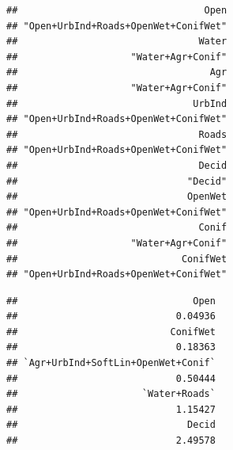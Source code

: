 \documentclass[12pt,]{book}
\newenvironment{Shaded}{\begin{snugshade}}{\end{snugshade}}
\newcommand{\CommentTok}[1]{\textcolor[rgb]{0.56,0.35,0.01}{\textit{#1}}}
\newcommand{\DataTypeTok}[1]{\textcolor[rgb]{0.13,0.29,0.53}{#1}}
\newcommand{\KeywordTok}[1]{\textcolor[rgb]{0.13,0.29,0.53}{\textbf{#1}}}
\newcommand{\NormalTok}[1]{#1}
\newcommand{\OperatorTok}[1]{\textcolor[rgb]{0.81,0.36,0.00}{\textbf{#1}}}
\newcommand{\StringTok}[1]{\textcolor[rgb]{0.31,0.60,0.02}{#1}}
\begin{document}
\begin{verbatim}
##                                 Open 
## "Open+UrbInd+Roads+OpenWet+ConifWet" 
##                                Water 
##                    "Water+Agr+Conif" 
##                                  Agr 
##                    "Water+Agr+Conif" 
##                               UrbInd 
## "Open+UrbInd+Roads+OpenWet+ConifWet" 
##                                Roads 
## "Open+UrbInd+Roads+OpenWet+ConifWet" 
##                                Decid 
##                              "Decid" 
##                              OpenWet 
## "Open+UrbInd+Roads+OpenWet+ConifWet" 
##                                Conif 
##                    "Water+Agr+Conif" 
##                             ConifWet 
## "Open+UrbInd+Roads+OpenWet+ConifWet"
\end{verbatim}

\begin{Shaded}
\end{Shaded}

\begin{verbatim}
##                               Open 
##                            0.04936 
##                           ConifWet 
##                            0.18363 
## `Agr+UrbInd+SoftLin+OpenWet+Conif` 
##                            0.50444 
##                      `Water+Roads` 
##                            1.15427 
##                              Decid 
##                            2.49578
\end{verbatim}

\begin{Shaded}
\end{Shaded}
\end{document}
